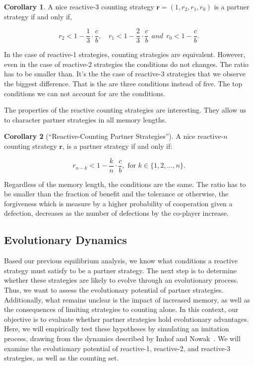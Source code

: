 \documentclass{article}
\theoremstyle{definition}
\newtheorem{corollary}{Corollary}[theorem]
\begin{document}
\begin{corollary}
A nice reactive-3 counting strategy $\mathbf{r} = (1, r_2, r_1, r_0)$ is a partner strategy if and only if,

\begin{equation}\label{eq:counting_three_bit_conditions}
  \displaystyle r_2 < 1- \frac{1}{3} \cdot \frac{c}{b}, \quad r_1 < 1- \frac{2}{3} \cdot \frac{c}{b} ~~and~~ r_0 < 1\!-\! \frac{c}{b}.
\end{equation}
\end{corollary}

In the case of reactive-1 strategies, counting strategies are equivalent.
However, even in the case of reactive-2 strategies the conditions do not
changes. The ratio has to be smaller than. It's the the case of reactive-3
strategies that we observe the biggest difference. That is the are three
conditions instead of five. The top conditions we can not account for are the
conditions.

The properties of the reactive counting strategies are interesting. They allow
us to character partner strategies in all memory lengths.

\begin{corollary}[``Reactive-Counting Partner Strategies'']\label{corollary:reactive_counting_partner_strategies}
A nice reactive-$n$ counting strategy $\mathbf{r}$,
is a partner strategy if and only if:

\begin{equation}
  r_{n - k} < 1 - \frac{k}{n} \cdot \frac{c}{b}, \text{ for } k \in \{1, 2, \dots, n\}.
\end{equation}
\end{corollary}

Regardless of the memory length, the conditions are the same. The ratio has to
be smaller than the fraction of benefit and the tolerance or otherwise, the
forgiveness which is measure by a higher probability of cooperation given a
defection, decreases as the number of defections by the co-player increase.


\subsection{Evolutionary Dynamics}

Based our previous equilibrium analysis, we know what conditions a reactive
strategy must satisfy to be a partner strategy. The next step is to determine
whether these strategies are likely to evolve through an evolutionary process.
Thus, we want to assess the evolutionary potential of partner strategies.
Additionally, what remains unclear is the impact of increased memory, as well as
the consequences of limiting strategies to counting alone. In this context, our
objective is to evaluate whether partner strategies hold evolutionary
advantages.
Here, we will empirically test these hypotheses by simulating an imitation
process, drawing from the dynamics described by Imhof and
Nowak~\cite{imhof:royal:2010}. We will examine the evolutionary potential of
reactive-1, reactive-2, and reactive-3 strategies, as well as the counting set.
\end{document}
